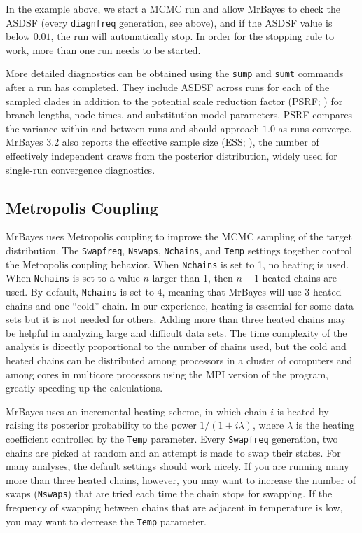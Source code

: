 \documentclass[12pt]{book}
\newcommand{\ttt}[1]{\texttt{#1}}
\begin{document}
In the example above, we start a MCMC run and allow MrBayes to check the ASDSF (every
\ttt{diagnfreq} generation, see above), and if the ASDSF value is below $0.01$, the run will
automatically stop. In order for the stopping rule to work, more than one run needs to be started.

More detailed diagnostics can be obtained using the \ttt{sump} and \ttt{sumt} commands after a run
has completed. They include ASDSF across runs for each of the sampled clades in addition to the
potential scale reduction factor (PSRF; \citep{gelman92}) for branch lengths, node times, and
substitution model parameters. PSRF compares the variance within and between runs and should
approach $1.0$ as runs converge. MrBayes 3.2 also reports the effective sample size (ESS;
\citep{ripley87}), the number of effectively independent draws from the posterior distribution,
widely used for single-run convergence diagnostics.


\subsection{Metropolis Coupling}
\label{metropolisCoupling}

MrBayes uses Metropolis coupling to improve the MCMC sampling of the target distribution. The
\ttt{Swapfreq}, \ttt{Nswaps}, \ttt{Nchains}, and \ttt{Temp} settings together control the
Metropolis coupling behavior. When \ttt{Nchains} is set to 1, no heating is used. When
\ttt{Nchains} is set to a value $n$ larger than 1, then $n - 1$ heated chains are used. By default,
\ttt{Nchains} is set to 4, meaning that MrBayes will use 3 heated chains and one ``cold'' chain. In
our experience, heating is essential for some data sets but it is not needed for others. Adding
more than three heated chains may be helpful in analyzing large and difficult data sets. The time
complexity of the analysis is directly proportional to the number of chains used, but the cold and
heated chains can be distributed among processors in a cluster of computers and among cores in
multicore processors using the MPI version of the program, greatly speeding up the calculations.

MrBayes uses an incremental heating scheme, in which chain $i$ is heated by raising its posterior
probability to the power $1/ (1 + i\lambda)$, where $\lambda$ is the heating coefficient controlled
by the \ttt{Temp} parameter. Every \ttt{Swapfreq} generation, two chains are picked at random and
an attempt is made to swap their states. For many analyses, the default settings should work
nicely. If you are running many more than three heated chains, however, you may want to increase
the number of swaps (\ttt{Nswaps}) that are tried each time the chain stops for swapping. If the
frequency of swapping between chains that are adjacent in temperature is low, you may want to
decrease the \ttt{Temp} parameter.
\end{document}

